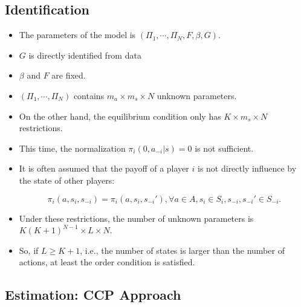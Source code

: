 \documentclass[]{book}
\providecommand{\tightlist}{%
  \setlength{\itemsep}{0pt}\setlength{\parskip}{0pt}}
\begin{document}
\subsection{Identification}\label{identification-1}

\begin{itemize}
\tightlist
\item
  The parameters of the model is
  \((\Pi_1, \cdots, \Pi_N, F, \beta, G)\).
\item
  \(G\) is directly identified from data
\item
  \(\beta\) and \(F\) are fixed.
\item
  \((\Pi_1, \cdots, \Pi_N)\) contains \(m_a \times m_s \times N\)
  unknown parameters.
\item
  On the other hand, the equilibrium condition only has
  \(K \times m_s \times N\) restrictions.
\item
  This time, the normalization \(\pi_i(0, a_{-i}|s) = 0\) is not
  sufficient.
\item
  It is often assumed that the payoff of a player \(i\) is not directly
  influence by the state of other players:

  \begin{equation}
  \pi_i(a, s_i, s_{-i}) = \pi_i(a, s_i, s_{-i}'), \forall a \in A, s_i \in S_i, s_{-i}, s_{-i}' \in S_{-i}.
  \end{equation}
\item
  Under these restrictions, the number of unknown parameters is
  \(K (K + 1)^{N - 1} \times L \times N\).
\item
  So, if \(L \ge K + 1\), i.e., the number of states is larger than the
  number of actions, at least the order condition is satisfied.
\end{itemize}

\subsection{Estimation: CCP Approach}\label{estimation-ccp-approach}
\end{document}
